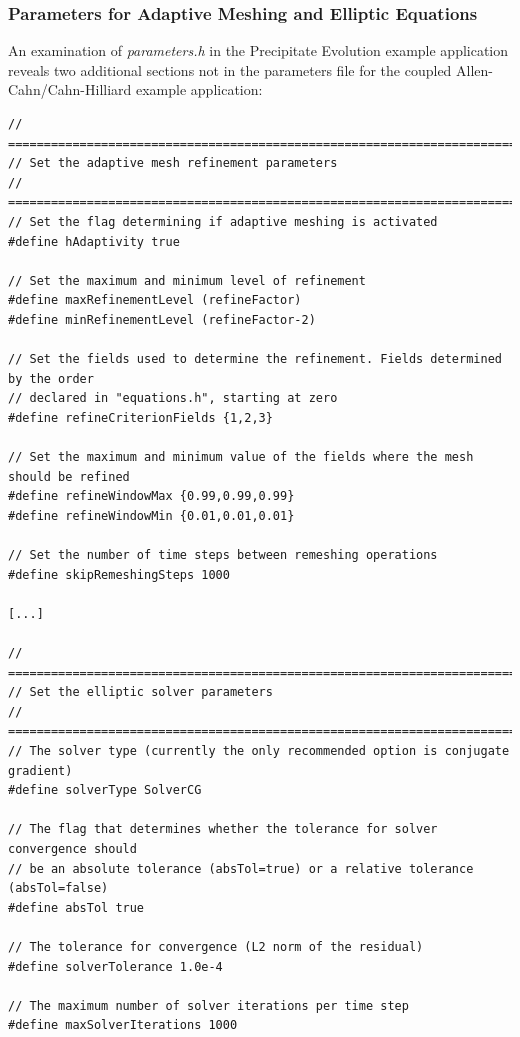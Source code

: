 \documentclass[10pt]{article} %
\begin{document}
\subsubsection{Parameters for Adaptive Meshing and Elliptic Equations}
An examination of \emph{parameters.h} in the Precipitate Evolution example application reveals two additional sections not in the parameters file for the coupled Allen-Cahn/Cahn-Hilliard example application:
\tiny
\begin{lstlisting}
// =================================================================================
// Set the adaptive mesh refinement parameters
// =================================================================================
// Set the flag determining if adaptive meshing is activated
#define hAdaptivity true

// Set the maximum and minimum level of refinement
#define maxRefinementLevel (refineFactor)
#define minRefinementLevel (refineFactor-2)

// Set the fields used to determine the refinement. Fields determined by the order
// declared in "equations.h", starting at zero
#define refineCriterionFields {1,2,3}

// Set the maximum and minimum value of the fields where the mesh should be refined
#define refineWindowMax {0.99,0.99,0.99}
#define refineWindowMin {0.01,0.01,0.01}

// Set the number of time steps between remeshing operations
#define skipRemeshingSteps 1000

[...]

// =================================================================================
// Set the elliptic solver parameters
// =================================================================================
// The solver type (currently the only recommended option is conjugate gradient)
#define solverType SolverCG

// The flag that determines whether the tolerance for solver convergence should
// be an absolute tolerance (absTol=true) or a relative tolerance (absTol=false)
#define absTol true

// The tolerance for convergence (L2 norm of the residual)
#define solverTolerance 1.0e-4

// The maximum number of solver iterations per time step
#define maxSolverIterations 1000
\end{lstlisting}
\normalsize
\end{document}
